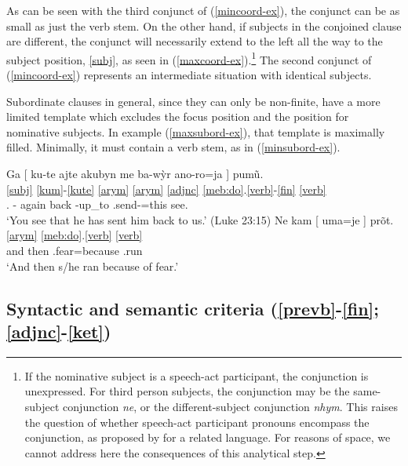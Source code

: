 \documentclass[output=paper]{langscibook}
\begin{document}
As can be seen with the third conjunct of (\ref{mincoord-ex}), the conjunct can be as small as just the verb stem. On the other hand, if subjects in the conjoined clause are different, the conjunct will necessarily extend to the left all the way to the subject position, \ref{subj}, as seen in (\ref{maxcoord-ex}).\footnote{If the nominative subject is a speech-act participant, the conjunction is unexpressed. For third person subjects, the conjunction may be the same-subject conjunction {\em ne}, or the different-subject conjunction {\em nhym}. This raises the question of whether speech-act participant pronouns encompass the conjunction, as proposed by \citet{nonato:phd} for a related language. For reasons of space, we cannot address here the consequences of this analytical step.} The second conjunct of (\ref{mincoord-ex}) represents an intermediate situation with identical subjects.

Subordinate clauses in general, since they can only be non-finite, have a more limited template which excludes the focus position and the position for nominative subjects. In example (\ref{maxsubord-ex}), that template is maximally filled. Minimally, it must contain a verb stem, as in (\ref{minsubord-ex}).


\ea
    \ea\label{maxsubord-ex}\glll Ga [ ku-te ajte akubyn me ba-wỳr {ano-ro=ja ]} pumũ.\\
                  \ref{subj} {} \ref{kum}-\ref{kute} \ref{arym} \ref{arym} \ref{adjnc} {} \ref{meb:do}.\ref{verb}-\ref{fin} \ref{verb}\\
                  \Second.\Nom{} {} \Third\Acc-\Erg{} again back \Pl{} \First\Incl{}-up\_to \Third.send-\Nfin=this see.\Fin {}\\
                \glt `You see that he has sent him back to us.' (Luke 23:15)
    \ex\label{minsubord-ex}\glll Ne kam [ {uma=je ]} prõt.\\
                   {} \ref{arym} {} \ref{meb:do}.\ref{verb} \ref{verb}\\
                   and then {} \Third.fear=because \Third.run\\
                \glt `And then s/he ran because of fear.'
    \z
\z



\subsection{Syntactic and semantic criteria (\ref{prevb}-\ref{fin}; \ref{adjnc}-\ref{ket})}
\end{document}
